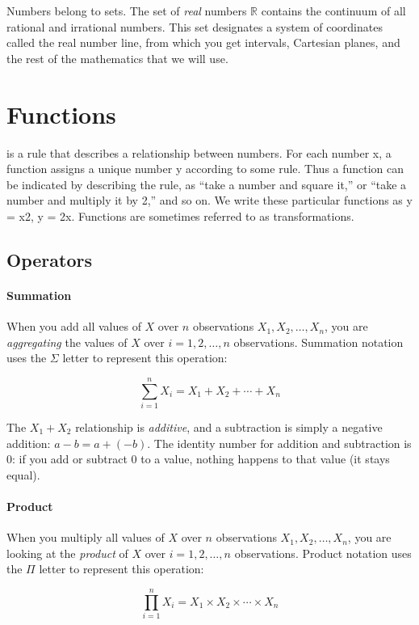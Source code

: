 Numbers belong to sets. The set of \emph{real} numbers $\mathbb{R}$ contains the continuum of all rational and irrational numbers. This set designates a system of coordinates called the real number line, from which you get intervals, Cartesian planes, and the rest of the mathematics that we will use.

%
%
%
\section{Functions}

 is a rule that describes a relationship between numbers. For each number x, a function assigns a unique number y according to some rule. Thus a function can be indicated by describing the rule, as “take a number and square it,” or “take a number and multiply it by 2,” and so on. We write these particular functions as y = x2, y = 2x. Functions are sometimes referred to as transformations.%

%
%
\subsection{Operators}

%
\paragraph{Summation}%
  When you add all values of $X$ over $n$ observations $X_1, X_2, \ldots, X_n$, you are \emph{aggregating} the values of $X$ over $i = 1, 2, \ldots, n$ observations. Summation notation uses the $\Sigma$ letter to represent this operation:%

  $$\sum_{i=1}^n X_i = X_1 + X_2 + \cdots + X_n$$

  The $X_1 + X_2$ relationship is \emph{additive}, and a subtraction is simply a negative addition: $a-b=a+(-b)$. The identity number for addition and subtraction is 0: if you add or subtract 0 to a value, nothing happens to that value (it stays equal).%

\paragraph{Product}%
  When you multiply all values of $X$ over $n$ observations $X_1, X_2, \ldots, X_n$, you are looking at the \emph{product} of $X$ over $i = 1, 2, \ldots, n$ observations. Product notation uses the $\Pi$ letter to represent this operation:%

  $$\prod_{i=1}^n X_i = X_1 \times X_2 \times \cdots \times X_n$$

